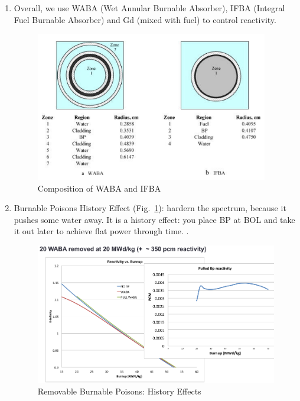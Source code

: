 \documentclass{school-22.211-notes}
\begin{document}
\clearpage
{}
\begin{enumerate}
\item Overall, we use WABA (Wet Annular Burnable Absorber), IFBA (Integral Fuel Burnable Absorber) and Gd (mixed with fuel) to control reactivity. 
  \begin{figure}
    \centering
    \includegraphics[width=4in]{images/dfs/WABA-IFBA.png}
    \caption{Composition of WABA and IFBA} 
  \end{figure}

\item Burnable Poisons History Effect (Fig.~\ref{BP-history-effect}): hardern the spectrum, because it pushes some water away. It is a history effect: you place BP at BOL and take it out later to achieve flat power through time. . 
  \begin{figure}
    \centering
    \includegraphics[width=5in]{images/dfs/BP-history-effect.png}
    \caption{Removable Burnable Poisons: History Effects}  \label{BP-history-effect}
  \end{figure}



\end{enumerate}
\end{document}
